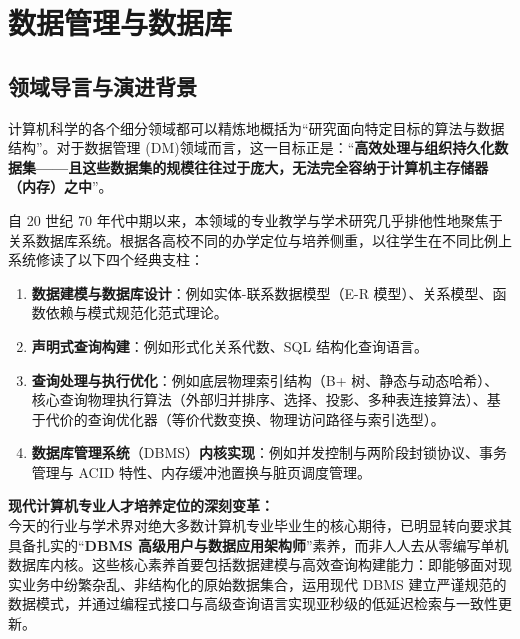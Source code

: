 \chapter{数据管理与数据库}

\section{领域导言与演进背景}

\begin{preamblebox}[知识领域概述与时代演进]
计算机科学的各个细分领域都可以精炼地概括为“研究面向特定目标的算法与数据结构”。对于数据管理 (DM)领域而言，这一目标正是：“\textbf{高效处理与组织持久化数据集——且这些数据集的规模往往过于庞大，无法完全容纳于计算机主存储器（内存）之中}”。

自 20 世纪 70 年代中期以来，本领域的专业教学与学术研究几乎排他性地聚焦于关系数据库系统。根据各高校不同的办学定位与培养侧重，以往学生在不同比例上系统修读了以下四个经典支柱：
\begin{enumerate}
    \item \textbf{数据建模与数据库设计}：例如实体-联系数据模型（E-R 模型）、关系模型、函数依赖与模式规范化范式理论。
    \item \textbf{声明式查询构建}：例如形式化关系代数、SQL 结构化查询语言。
    \item \textbf{查询处理与执行优化}：例如底层物理索引结构（B+ 树、静态与动态哈希）、核心查询物理执行算法（外部归并排序、选择、投影、多种表连接算法）、基于代价的查询优化器（等价代数变换、物理访问路径与索引选型）。
    \item \textbf{数据库管理系统}（DBMS）\textbf{内核实现}：例如并发控制与两阶段封锁协议、事务管理与 ACID 特性、内存缓冲池置换与脏页调度管理。
\end{enumerate}

\textbf{现代计算机专业人才培养定位的深刻变革：}\\
今天的行业与学术界对绝大多数计算机专业毕业生的核心期待，已明显转向要求其具备扎实的“\textbf{DBMS 高级用户与数据应用架构师}”素养，而非人人去从零编写单机数据库内核。这些核心素养首要包括数据建模与高效查询构建能力：即能够面对现实业务中纷繁杂乱、非结构化的原始数据集合，运用现代 DBMS 建立严谨规范的数据模式，并通过编程式接口与高级查询语言实现亚秒级的低延迟检索与一致性更新。


\end{preamblebox}
